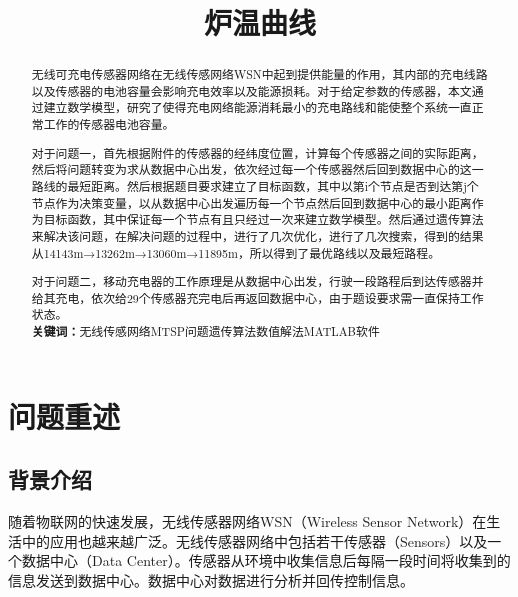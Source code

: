 \documentclass{article}
\title{\zihao{-2}炉温曲线\vspace{-2em}}
\date{}     %
\author{}   %
\begin{document}
\setlength{\parindent}{2em}         
\maketitle                                                  %
\thispagestyle{empty}                                       %
\begin{abstract}                                            %
{                                                 %
无线可充电传感器网络在无线传感网络WSN中起到提供能量的作用，其内部的充电线路以及传感器的电池容量会影响充电效率以及能源损耗。对于给定参数的传感器，本文通过建立数学模型，研究了使得充电网络能源消耗最小的充电路线和能使整个系统一直正常工作的传感器电池容量。

对于问题一，首先根据附件的传感器的经纬度位置，计算每个传感器之间的实际距离，然后将问题转变为求从数据中心出发，依次经过每一个传感器然后回到数据中心的这一路线的最短距离。然后根据题目要求建立了目标函数，其中以第i个节点是否到达第j个节点作为决策变量，以从数据中心出发遍历每一个节点然后回到数据中心的最小距离作为目标函数，其中保证每一个节点有且只经过一次来建立数学模型。然后通过遗传算法来解决该问题，在解决问题的过程中，进行了几次优化，进行了几次搜索，得到的结果从14143m→13262m→13060m→11895m，所以得到了最优路线以及最短路程。

对于问题二，移动充电器的工作原理是从数据中心出发，行驶一段路程后到达传感器并给其充电，依次给29个传感器充完电后再返回数据中心，由于题设要求需一直保持工作状态。\\

\noindent \textbf{关键词：}无线传感网络\quad MTSP问题\quad 遗传算法\quad 数值解法\quad MATLAB软件
}
\end{abstract}                                              %
\newpage                                                    %
\setcounter{page}{1}                                        %
\section{问题重述}                                          %
\subsection{背景介绍}
随着物联网的快速发展，无线传感器网络WSN（Wireless Sensor Network）在生活中的应用也越来越广泛。无线传感器网络中包括若干传感器（Sensors）以及一个数据中心（Data Center）。传感器从环境中收集信息后每隔一段时间将收集到的信息发送到数据中心。数据中心对数据进行分析并回传控制信息。
\end{document}
